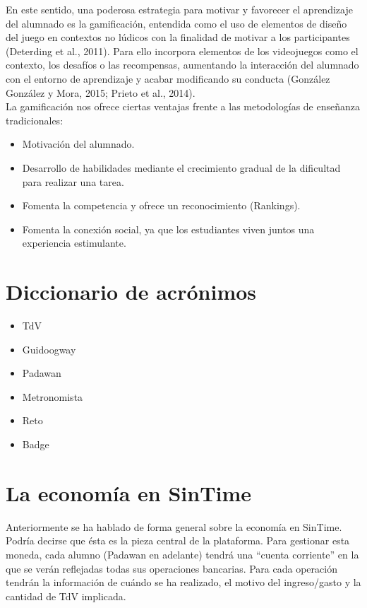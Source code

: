 En este sentido, una poderosa estrategia para motivar y favorecer el aprendizaje del alumnado es la gamificación, entendida como el uso de elementos de diseño del juego en contextos no lúdicos con la finalidad de motivar a los participantes (Deterding et al., 2011). Para ello incorpora elementos de los videojuegos como el contexto, los desafíos o las recompensas, aumentando la interacción del alumnado con el entorno de aprendizaje y acabar modificando su conducta (González González y Mora, 2015; Prieto et al., 2014).\\


La gamificación nos ofrece ciertas ventajas frente a las metodologías de enseñanza tradicionales:\\

\begin{itemize}
\item Motivación del alumnado.
\item Desarrollo de habilidades mediante el crecimiento gradual de la dificultad para realizar una tarea.
\item Fomenta la competencia y ofrece un reconocimiento (Rankings).
\item Fomenta la conexión social, ya que los estudiantes viven juntos una experiencia estimulante.
\end{itemize}

\section{Diccionario de acrónimos}
\begin{itemize}
\item \ac{TdV}
\item \ac{Guidoogway}
\item \ac{Padawan}
\item \ac{Metronomista}
\item \ac{Reto}
\item \ac{Badge}
\end{itemize}

\section{La economía en SinTime}
Anteriormente se ha hablado de forma general sobre la economía en SinTime. Podría decirse que ésta es la pieza central de la plataforma. Para gestionar esta moneda, cada alumno (Padawan en adelante) tendrá una ``cuenta corriente'' en la que se verán reflejadas todas sus operaciones bancarias. Para cada operación tendrán la información de cuándo se ha realizado, el motivo del ingreso/gasto y la cantidad de TdV implicada.\\

